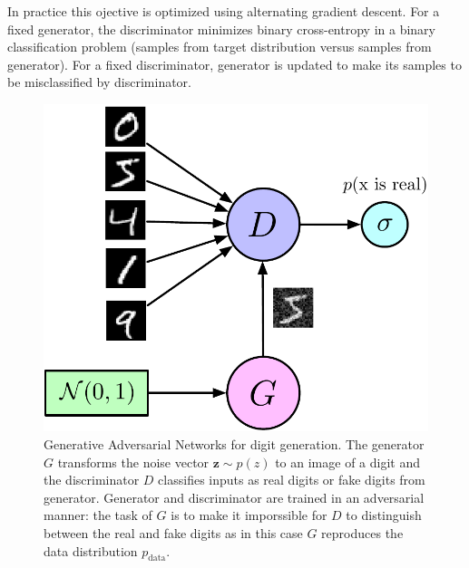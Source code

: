 \documentclass{webofc}
\newcommand{\vx}{\mathbf{x}}
\newcommand{\vz}{\mathbf{z}}
\newcommand{\pdata}{\ensuremath{p_{\text{data}}}}
\begin{document}
In practice this ojective is optimized using alternating gradient descent. For a fixed generator, the discriminator minimizes binary cross-entropy in a binary classification problem (samples from target distribution versus samples from generator). For a fixed discriminator, generator is updated to make its samples to be misclassified by discriminator.   


\begin{figure}
\centering
\includegraphics[width=0.3\linewidth]{figures/gan_pic.pdf}
\caption{Generative Adversarial Networks for digit generation. The generator $G$ transforms the noise vector $\vz \sim p(z)$ to an image of a digit and the discriminator $D$ classifies inputs as real digits or fake digits from generator. Generator and discriminator are trained in an adversarial manner: the task of $G$ is to make it imporssible for $D$ to distinguish between the real and fake digits as in this case $G$ reproduces the data distribution $\pdata$.}
\label{fig:GANs}
\end{figure}


\end{document}
